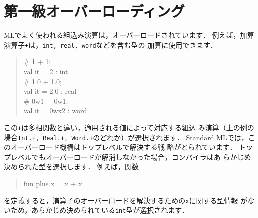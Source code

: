 \documentclass{jbook}
\newif\ifjp
\newcommand{\txt}[2]{#1}
\begin{document}
\section{
\txt{第一級オーバーローディング}
    {First-class overloading}
}
\label{sec:extensionOverloading}

\ifjp%
	MLでよく使われる組込み演算は，オーバーロードされています．
	例えば，加算演算子{\tt +}は，{\tt int, real, word}などを含む型の
加算に使用できます．
\begin{tt}
\begin{quote}
\# 1 + 1;\\
val it = 2 : int\\
\# 1.0 + 1.0;\\
val it = 2.0 : real\\
\# 0w1 + 0w1;\\
val it = 0wx2 : word
\end{quote}
\end{tt}
	この{\tt +}は多相関数と違い，適用される値によって対応する組込
み演算（上の例の場合{\tt Int.+, Real.+, Word.+}のどれか）が選択されます．
	Standard MLでは，このオーバーロード機構はトップレベルで解決する戦
略がとられています．
	トップレベルでもオーバーロードが解消しなかった場合，コンパイラはあ
らかじめ決められた型を選択します．
	例えば，関数
\begin{tt}
\begin{quote}
fun plus x = x + x
\end{quote}
\end{tt}
を定義すると，演算子のオーバーロードを解決するための{\tt x}に関する型情報
がないため，あらかじめ決められている{\tt int}型が選択されます．
	
\end{document}
